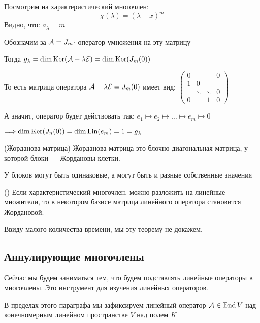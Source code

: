 \vspace*{3mm}
Посмотрим на характеристический многочлен:
    \[  \chi(\lambda) = (\lambda - x)^m \]
Видно, что: $ a_{\lambda} = m $

Обозначим за $\mathcal{A} = J_m \cdot$ оператор умножения на эту матрицу

Тогда $ g_{\lambda} = \dim \operatorname{Ker}(\mathcal{A} - \lambda\mathcal{E}) = \dim \operatorname{Ker}(J_{m}(0))$

То есть матрица оператора $\mathcal{A} - \lambda\mathcal{E} = J_{m} (0)$ имеет вид:
$ \left(\begin{array}{cccc}
0 &  &  & 0 \\
1 & 0 &  &  \\
 & \ddots & \ddots & 0 \\ 
0 &  & 1 & 0
\end{array}\right) $

А значит, оператор будет действовать так: $e_1 \mapsto e_2 \mapsto \dots \mapsto e_m \mapsto 0$

$\Longrightarrow \dim \operatorname{Ker}(J_{n}(0)) = \dim \operatorname{Lin} (e_m) = 1 = g_{\lambda}$

\begin{conj}(Жорданова матрица)
    Жорданова матрица это блочно-диагональная матрица, у которой блоки --- Жордановы клетки.

    У блоков могут быть одинаковые, а могут быть и разные собственные значения
\end{conj}

\begin{theorem}()
    Если характеристический многочлен, можно разложить на линейные множители,
    то в некотором базисе матрица линейного оператора становится Жордановой.

    Ввиду малого количества времени, мы эту теорему не докажем.
\end{theorem}

\vspace*{5mm}

\subsection*{Аннулирующие многочлены}

Сейчас мы будем заниматься тем, что будем подставлять линейные операторы в многочлены.
Это инструмент для изучения линейных операторов.

\vspace*{3mm}

В пределах этого параграфа мы зафиксируем линейный оператор $\mathcal{A} \in \operatorname{End} V$ над конечномерным линейном пространстве $V$ над полем $K$

